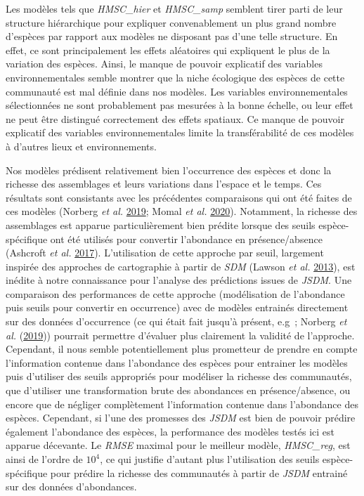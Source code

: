 \documentclass[12pt,]{article}
\begin{document}
Les modèles tels que \emph{HMSC\_hier} et \emph{HMSC\_samp} semblent
tirer parti de leur structure hiérarchique pour expliquer convenablement
un plus grand nombre d'espèces par rapport aux modèles ne disposant pas
d'une telle structure. En effet, ce sont principalement les effets
aléatoires qui expliquent le plus de la variation des espèces. Ainsi, le
manque de pouvoir explicatif des variables environnementales semble
montrer que la niche écologique des espèces de cette communauté est mal
définie dans nos modèles. Les variables environnementales sélectionnées
ne sont probablement pas mesurées à la bonne échelle, ou leur effet ne
peut être distingué correctement des effets spatiaux. Ce manque de
pouvoir explicatif des variables environnementales limite la
transférabilité de ces modèles à d'autres lieux et environnements.

Nos modèles prédisent relativement bien l'occurrence des espèces et donc
la richesse des assemblages et leurs variations dans l'espace et le
temps. Ces résultats sont consistants avec les précédentes comparaisons
qui ont été faites de ces modèles (Norberg \emph{et al.}
\protect\hyperlink{ref-Norberg_2020}{2019}; Momal \emph{et al.}
\protect\hyperlink{ref-Momal_2020}{2020}). Notamment, la richesse des
assemblages est apparue particulièrement bien prédite lorsque des seuils
espèce-spécifique ont été utilisés pour convertir l'abondance en
présence/absence (Ashcroft \emph{et al.}
\protect\hyperlink{ref-Ashcroft_2017}{2017}). L'utilisation de cette
approche par seuil, largement inspirée des approches de cartographie à
partir de \emph{SDM} (Lawson \emph{et al.}
\protect\hyperlink{ref-Lawson_2013}{2013}), est inédite à notre
connaissance pour l'analyse des prédictions issues de \emph{JSDM}. Une
comparaison des performances de cette approche (modélisation de
l'abondance puis seuils pour convertir en occurrence) avec de modèles
entrainés directement sur des données d'occurrence (ce qui était fait
jusqu'à présent, e.g~; Norberg \emph{et al.}
(\protect\hyperlink{ref-Norberg_2020}{2019})) pourrait permettre
d'évaluer plus clairement la validité de l'approche. Cependant, il nous
semble potentiellement plus prometteur de prendre en compte
l'information contenue dans l'abondance des espèces pour entrainer les
modèles puis d'utiliser des seuils appropriés pour modéliser la richesse
des communautés, que d'utiliser une transformation brute des abondances
en présence/absence, ou encore que de négliger complètement
l'information contenue dans l'abondance des espèces. Cependant, si l'une
des promesses des \emph{JSDM} est bien de pouvoir prédire également
l'abondance des espèces, la performance des modèles testés ici est
apparue décevante. Le \emph{RMSE} maximal pour le meilleur modèle,
\emph{HMSC\_reg}, est ainsi de l'ordre de \(10^4\), ce qui justifie
d'autant plus l'utilisation des seuils espèce-spécifique pour prédire la
richesse des communautés à partir de \emph{JSDM} entrainé sur des
données d'abondances.
\end{document}
